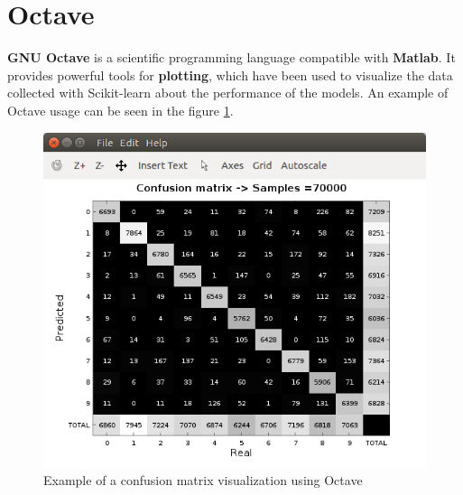 \section{Octave} \label{sec:octave}
\textbf{GNU Octave} \cite{octave} is a scientific programming language compatible with \textbf{Matlab}. It provides powerful tools for \textbf{plotting}, which have been used to visualize the data collected with Scikit-learn about the performance of the models. An example of Octave usage can be seen in the figure \ref{fig:conf_mat}.
\begin{figure}
	\centering
	\includegraphics[width=12cm, keepaspectratio]{figures/conf_mat.png}
	\caption{Example of a confusion matrix visualization using Octave}
	\label{fig:conf_mat}
\end{figure}